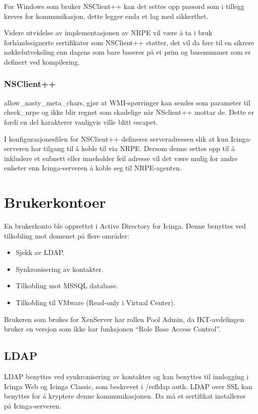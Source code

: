 For Windows som bruker NSClient++ kan det settes opp passord som i tillegg kreves for kommunikasjon, dette legger enda et lag med sikkerthet.

Videre utvidelse av implementasjonen av NRPE vil være å ta i bruk forhåndssignerte sertifikater 
som NSClient++ støtter, det vil da føre til en sikrere nøkkelutveksling enn dagens som bare baseres på et prim og basenummer som er definert ved kompilering.

\subsubsection{NSClient++}
allow\_nasty\_meta\_chars, gjør at WMI-spørringer kan sendes som parameter til check\_nrpe og ikke blir regnet som skadelige når NSclient++ mottar de. Dette er fordi en del karakterer vanligvis ville blitt escapet.

I konfigurasjonesfilen for NSClient++ defineres serveradressen slik at kun Icinga-serveren har tilgang til å koble til via NRPE. Dersom denne settes opp til å inkludere et subnett eller inneholder feil adresse vil det være mulig for andre enheter enn Icinga-serveren å koble seg til NRPE-agenten.

\section{Brukerkontoer}
En brukerkonto ble opprettet i Active Directory for Icinga. Denne benyttes ved tilkobling mot domenet på flere områder:
\begin{itemize}
	\item Sjekk av LDAP.
	\item Synkronisering av kontakter.
	\item Tilkobling mot MSSQL database.
	\item Tilkobling til VMware (Read-only i Virtual Center).
\end{itemize}
Brukeren som brukes for XenServer har rollen Pool Admin, da IKT-avdelingen bruker en versjon som ikke har funksjonen ``Role Base Access Control''. 

\subsection{LDAP}
LDAP benyttes ved synkronisering av kontakter og kan benyttes til innlogging i Icinga Web og Icinga Classic, som beskrevet i /ref{ldap auth}. LDAP over SSL kan benyttes for å kryptere denne kommunikasjonen. Da må et sertifikat installeres på Icinga-serveren.
